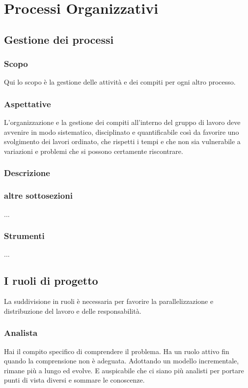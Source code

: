 \section{Processi Organizzativi}
\label{organizzativi}


\subsection{Gestione dei processi}
    \subsubsection{Scopo}
        Qui lo scopo è la gestione delle attività e dei compiti per ogni altro processo.
    \subsubsection{Aspettative}
        L'organizzazione e la gestione dei compiti all'interno del gruppo di lavoro deve avvenire in modo sistematico, disciplinato e quantificabile così da favorire uno svolgimento dei lavori ordinato, che rispetti i tempi e che non sia vulnerabile a variazioni e problemi che si possono certamente riscontrare.
    \subsubsection{Descrizione}

    \subsubsection{altre sottosezioni}
    ...
    \subsubsection{Strumenti}
    ...

\subsection{I ruoli di progetto}
    La suddivisione in ruoli è necessaria per favorire la parallelizzazione e distribuzione del lavoro e delle responsabilità.
    \subsubsection{Analista}
        Hai il compito specifico di comprendere il problema. Ha un ruolo attivo fin quando la comprensione non è adeguata. Adottando un modello incrementale, rimane più a lungo ed evolve. E auspicabile che ci siano più analisti per portare punti di vista diversi e sommare le conoscenze.
